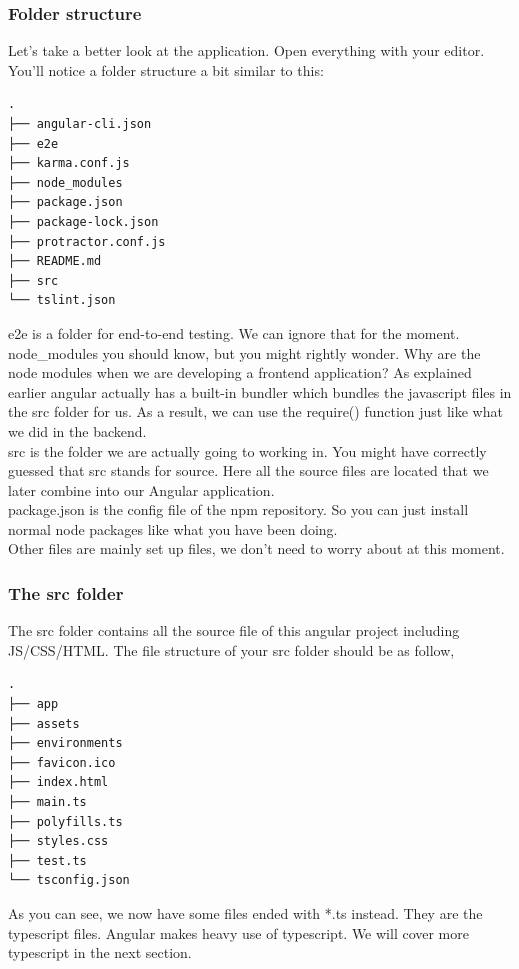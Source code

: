 \documentclass[a4paper]{article}
\begin{document}
\subsubsection{Folder structure}
Let’s take a better look at the application. Open everything with your editor. You’ll notice a folder structure a bit similar to this:
\begin{lstlisting}
.
├── angular-cli.json
├── e2e
├── karma.conf.js
├── node_modules
├── package.json
├── package-lock.json
├── protractor.conf.js
├── README.md
├── src
└── tslint.json
\end{lstlisting}
e2e is a folder for end-to-end testing. We can ignore that for the moment.\\

node_modules you should know, but you might rightly wonder. Why are the node modules when we are developing a frontend application? As explained earlier angular actually has a built-in bundler which bundles the javascript files in the src folder for us. As a result, we can use the require() function just like what we did in the backend.\\

src is the folder we are actually going to working in. You might have correctly guessed that src stands for source. Here all the source files are located that we later combine into our Angular application.\\

package.json is the config file of the npm repository. So you can just install normal node packages like what you have been doing.\\

Other files are mainly set up files, we don’t need to worry about at this moment.
\subsubsection{The src folder}
The src folder contains all the source file of this angular project including JS/CSS/HTML. The file structure of your src folder should be as follow,
\begin{lstlisting}
.
├── app
├── assets
├── environments
├── favicon.ico
├── index.html
├── main.ts
├── polyfills.ts
├── styles.css
├── test.ts
└── tsconfig.json
\end{lstlisting}
As you can see, we now have some files ended with *.ts instead. They are the typescript files. Angular makes heavy use of typescript. We will cover more typescript in the next section.\\
\end{document}
